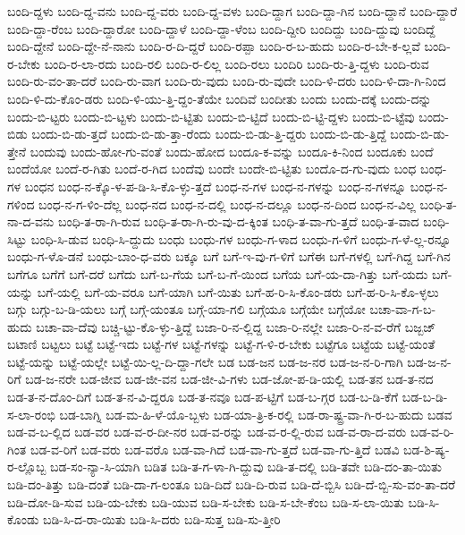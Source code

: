 {ಬಂದಿ-ದ್ದಳು
ಬಂದಿ-ದ್ದ-ವನು
ಬಂದಿ-ದ್ದ-ವರು
ಬಂದಿ-ದ್ದ-ವಳು
ಬಂದಿ-ದ್ದಾಗ
ಬಂದಿ-ದ್ದಾ-ಗಿನ
ಬಂದಿ-ದ್ದಾನೆ
ಬಂದಿ-ದ್ದಾರೆ
ಬಂದಿ-ದ್ದಾ-ರೆಂಬ
ಬಂದಿ-ದ್ದಾರೋ
ಬಂದಿ-ದ್ದಾಳೆ
ಬಂದಿ-ದ್ದಾ-ಳೆಂಬ
ಬಂದಿ-ದ್ದೀರಿ
ಬಂದಿದ್ದು
ಬಂದಿ-ದ್ದುವು
ಬಂದಿದ್ದೆ
ಬಂದಿ-ದ್ದೇನೆ
ಬಂದಿ-ದ್ದೇ-ನೆ-ನಾನು
ಬಂದಿ-ರ-ದಿ-ದ್ದರೆ
ಬಂದಿ-ರಪ್ಪಾ
ಬಂದಿ-ರ-ಬ-ಹುದು
ಬಂದಿ-ರ-ಬೇ-ಕ-ಲ್ಲವೆ
ಬಂದಿ-ರ-ಬೇಕು
ಬಂದಿ-ರ-ಲಾ-ರದು
ಬಂದಿ-ರಲಿ
ಬಂದಿ-ರ-ಲಿಲ್ಲ
ಬಂದಿ-ರಲು
ಬಂದಿರಿ
ಬಂದಿ-ರು-ತ್ತಿ-ದ್ದಳು
ಬಂದಿ-ರುವ
ಬಂದಿ-ರು-ವಂ-ತಾ-ದರೆ
ಬಂದಿ-ರು-ವಾಗ
ಬಂದಿ-ರು-ವುದು
ಬಂದಿ-ರು-ವುದೇ
ಬಂದಿ-ಳಿ-ದರು
ಬಂದಿ-ಳಿ-ದಾ-ಗಿ-ನಿಂದ
ಬಂದಿ-ಳಿ-ದು-ಕೊಂ-ಡರು
ಬಂದಿ-ಳಿ-ಯು-ತ್ತಿ-ದ್ದಂ-ತೆಯೇ
ಬಂದಿವೆ
ಬಂದೀತು
ಬಂದು
ಬಂದು-ದಕ್ಕೆ
ಬಂದು-ದನ್ನು
ಬಂದು-ಬಿ-ಟ್ಟರು
ಬಂದು-ಬಿ-ಟ್ಟಳು
ಬಂದು-ಬಿ-ಟ್ಟಿತು
ಬಂದು-ಬಿ-ಟ್ಟಿದೆ
ಬಂದು-ಬಿ-ಟ್ಟಿ-ದ್ದಳು
ಬಂದು-ಬಿ-ಟ್ಟೆವು
ಬಂದು-ಬಿಡು
ಬಂದು-ಬಿ-ಡು-ತ್ತದೆ
ಬಂದು-ಬಿ-ಡು-ತ್ತಾ-ರೆಂದು
ಬಂದು-ಬಿ-ಡು-ತ್ತಿ-ದ್ದರು
ಬಂದು-ಬಿ-ಡು-ತ್ತಿದ್ದೆ
ಬಂದು-ಬಿ-ಡು-ತ್ತೇನೆ
ಬಂದುವು
ಬಂದು-ಹೋ-ಗು-ವಂತೆ
ಬಂದು-ಹೋದ
ಬಂದೂ-ಕ-ವನ್ನು
ಬಂದೂ-ಕಿ-ನಿಂದ
ಬಂದೂಕು
ಬಂದೆ
ಬಂದೆಯೋ
ಬಂದೆ-ರ-ಗಿತು
ಬಂದೆ-ರ-ಗಿದ
ಬಂದೆವು
ಬಂದೇ
ಬಂದೇ-ಬಿ-ಟ್ಟಿತು
ಬಂದೊ-ದ-ಗು-ವುದು
ಬಂಧ
ಬಂಧ-ಗಳ
ಬಂಧನ
ಬಂಧ-ನ-ಕ್ಕೊ-ಳ-ಪ-ಡಿ-ಸಿ-ಕೊ-ಳ್ಳು-ತ್ತದೆ
ಬಂಧ-ನ-ಗಳ
ಬಂಧ-ನ-ಗಳನ್ನು
ಬಂಧ-ನ-ಗಳನ್ನೂ
ಬಂಧ-ನ-ಗಳಿಂದ
ಬಂಧ-ನ-ಗ-ಳಿಂ-ದೆಲ್ಲ
ಬಂಧ-ನದ
ಬಂಧ-ನ-ದಲ್ಲಿ
ಬಂಧ-ನ-ದಲ್ಲೂ
ಬಂಧ-ನ-ದಿಂದ
ಬಂಧ-ನ-ವಿಲ್ಲ
ಬಂಧಿ-ತ-ನಾ-ದ-ವನು
ಬಂಧಿ-ತ-ರಾ-ಗಿ-ರುವ
ಬಂಧಿ-ತ-ರಾ-ಗಿ-ರು-ವು-ದ-ಕ್ಕಿಂತ
ಬಂಧಿ-ತ-ವಾ-ಗು-ತ್ತದೆ
ಬಂಧಿ-ತ-ವಾದ
ಬಂಧಿ-ಸಿಟ್ಟು
ಬಂಧಿ-ಸಿ-ಡುವ
ಬಂಧಿ-ಸಿ-ದ್ದುದು
ಬಂಧು
ಬಂಧು-ಗಳ
ಬಂಧು-ಗ-ಳಾದ
ಬಂಧು-ಗ-ಳಿಗೆ
ಬಂಧು-ಗ-ಳೆ-ಲ್ಲ-ರನ್ನೂ
ಬಂಧು-ಗ-ಳೊ-ಡನೆ
ಬಂಧು-ಬಾಂ-ಧ-ವರು
ಬಕ್ಕೂ
ಬಗೆ
ಬಗೆ-ಇ-ವು-ಗ-ಳಿಗೆ
ಬಗೆಈ
ಬಗೆ-ಗಳಲ್ಲಿ
ಬಗೆ-ಗಿದ್ದ
ಬಗೆ-ಗಿನ
ಬಗೆಗೂ
ಬಗೆಗೆ
ಬಗೆ-ದರೆ
ಬಗೆದು
ಬಗೆ-ಬ-ಗೆಯ
ಬಗೆ-ಬ-ಗೆ-ಯಿಂದ
ಬಗೆಯ
ಬಗೆ-ಯ-ದಾ-ಗಿತ್ತು
ಬಗೆ-ಯದು
ಬಗೆ-ಯನ್ನು
ಬಗೆ-ಯಲ್ಲಿ
ಬಗೆ-ಯ-ವರೂ
ಬಗೆ-ಯಾಗಿ
ಬಗೆ-ಯಿತು
ಬಗೆ-ಹ-ರಿ-ಸಿ-ಕೊಂ-ಡರು
ಬಗೆ-ಹ-ರಿ-ಸಿ-ಕೊ-ಳ್ಳಲು
ಬಗ್ಗು
ಬಗ್ಗು-ಬ-ಡಿ-ಯಲು
ಬಗ್ಗೆ
ಬಗ್ಗೆ-ಯಂತೂ
ಬಗ್ಗೆ-ಯಾ-ಗಲಿ
ಬಗ್ಗೆಯೂ
ಬಗ್ಗೆಯೇ
ಬಗ್ಗೆಯೋ
ಬಚಾ-ವಾ-ಗ-ಬ-ಹುದು
ಬಚಾ-ವಾ-ದೆವು
ಬಚ್ಚಿ-ಟ್ಟು-ಕೊ-ಳ್ಳು-ತ್ತಿದ್ದೆ
ಬಜಾ-ರಿ-ನ-ಲ್ಲಿದ್ದ
ಬಜಾ-ರಿ-ನಲ್ಲೇ
ಬಜಾ-ರಿ-ನ-ವ-ರೆಗೆ
ಬಜ್ಬಜ್
ಬಟಾಣಿ
ಬಟ್ಟಲು
ಬಟ್ಟೆ
ಬಟ್ಟೆ-ಇದು
ಬಟ್ಟೆ-ಗಳ
ಬಟ್ಟೆ-ಗಳನ್ನು
ಬಟ್ಟೆ-ಗ-ಳಿ-ರ-ಬೇಕು
ಬಟ್ಟೆಗೂ
ಬಟ್ಟೆಯ
ಬಟ್ಟೆ-ಯಂತೆ
ಬಟ್ಟೆ-ಯನ್ನು
ಬಟ್ಟೆ-ಯಲ್ಲೇ
ಬಟ್ಟೆ-ಯಿ-ಲ್ಲ-ದಿ-ದ್ದಾ-ಗಲೇ
ಬಡ
ಬಡ-ಜನ
ಬಡ-ಜ-ನರ
ಬಡ-ಜ-ನ-ರಿ-ಗಾಗಿ
ಬಡ-ಜ-ನ-ರಿಗೆ
ಬಡ-ಜ-ನರೇ
ಬಡ-ಜೀವ
ಬಡ-ಜೀ-ವನ
ಬಡ-ಜೀ-ವಿ-ಗಳು
ಬಡ-ಜೋ-ಪ-ಡಿ-ಯಲ್ಲಿ
ಬಡ-ತನ
ಬಡ-ತ-ನದ
ಬಡ-ತ-ನ-ದೊಂ-ದಿಗೆ
ಬಡ-ತ-ನ-ವಿ-ದ್ದರೂ
ಬಡ-ತ-ನವೂ
ಬಡ-ಪ-ಟ್ಟಿಗೆ
ಬಡ-ಬ-ಗ್ಗರ
ಬಡ-ಬ-ಡಿ-ಕೆಗೆ
ಬಡ-ಬ-ಡಿ-ಸ-ಲಾ-ರಂಭಿ
ಬಡ-ಬಾಗ್ನಿ
ಬಡ-ಮ-ಹಿ-ಳೆ-ಯೊ-ಬ್ಬಳು
ಬಡ-ಯಾ-ತ್ರಿ-ಕ-ರಲ್ಲಿ
ಬಡ-ರಾ-ಷ್ಟ್ರ-ವಾ-ಗಿ-ರ-ಬ-ಹುದು
ಬಡವ
ಬಡ-ವ-ಬ-ಲ್ಲಿದ
ಬಡ-ವರ
ಬಡ-ವ-ರ-ದೀ-ನರ
ಬಡ-ವ-ರನ್ನು
ಬಡ-ವ-ರ-ಲ್ಲಿ-ರುವ
ಬಡ-ವ-ರಾ-ದ-ವರು
ಬಡ-ವ-ರಿ-ಗಿಂತ
ಬಡ-ವ-ರಿಗೆ
ಬಡ-ವರು
ಬಡ-ವರೊ
ಬಡ-ವಾ-ಗಿದೆ
ಬಡ-ವಾ-ಗು-ತ್ತದೆ
ಬಡ-ವಾ-ಗು-ತ್ತಿದೆ
ಬಡವಿ
ಬಡ-ಶಿ-ಷ್ಯ-ರ-ಲ್ಲೊಬ್ಬ
ಬಡ-ಸಂ-ನ್ಯಾ-ಸಿ-ಯಾಗಿ
ಬಡಿತ
ಬಡಿ-ತ-ಗ-ಳಾ-ಗಿ-ದ್ದುವು
ಬಡಿ-ತ-ದಲ್ಲಿ
ಬಡಿ-ತವೇ
ಬಡಿ-ದಂ-ತಾ-ಯಿತು
ಬಡಿ-ದಂ-ತಿತ್ತು
ಬಡಿ-ದಂತೆ
ಬಡಿ-ದಾ-ಗ-ಲಂತೂ
ಬಡಿ-ದಿದೆ
ಬಡಿ-ದಿ-ರುವ
ಬಡಿ-ದೆ-ಬ್ಬಿಸಿ
ಬಡಿ-ದೆ-ಬ್ಬಿ-ಸು-ವಂ-ತಾ-ದರೆ
ಬಡಿ-ದೋ-ಡಿ-ಸುವ
ಬಡಿ-ಯ-ಬೇಕು
ಬಡಿ-ಯುವ
ಬಡಿ-ಸ-ಬೇಕು
ಬಡಿ-ಸ-ಬೇ-ಕೆಂಬ
ಬಡಿ-ಸ-ಲಾ-ಯಿತು
ಬಡಿ-ಸಿ-ಕೊಂಡು
ಬಡಿ-ಸಿ-ದ-ರಾ-ಯಿತು
ಬಡಿ-ಸಿ-ದರು
ಬಡಿ-ಸುತ್ತ
ಬಡಿ-ಸು-ತ್ತೀರಿ
}

